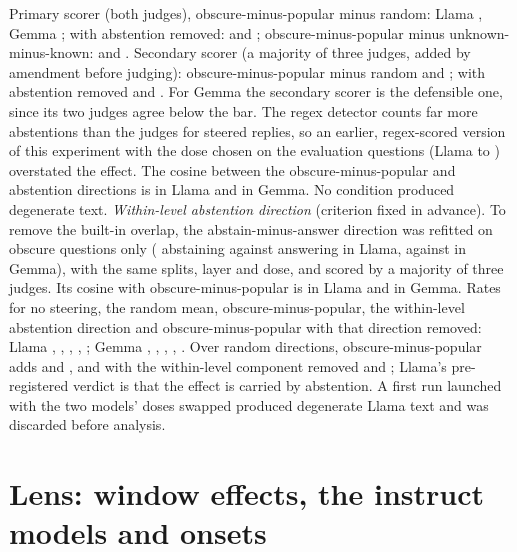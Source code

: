 \documentclass{article}
\begin{document}
Primary scorer (both judges), obscure-minus-popular minus random: Llama \svLlamaDOne{} \svLlamaDOneCI, Gemma \svGemmaDOne{} \svGemmaDOneCI; with abstention removed: \svLlamaDTwo{} \svLlamaDTwoCI{} and \svGemmaDTwo{} \svGemmaDTwoCI; obscure-minus-popular minus unknown-minus-known: \svLlamaDThree{} \svLlamaDThreeCI{} and \svGemmaDThree{} \svGemmaDThreeCI. Secondary scorer (a majority of three judges, added by amendment before judging): obscure-minus-popular minus random \svLlamaMajDOne{} \svLlamaMajDOneCI{} and \svGemmaMajDOne{} \svGemmaMajDOneCI; with abstention removed \svLlamaMajDTwo{} \svLlamaMajDTwoCI{} and \svGemmaMajDTwo{} \svGemmaMajDTwoCI. For Gemma the secondary scorer is the defensible one, since its two judges agree below the bar. The regex detector counts far more abstentions than the judges for steered replies, so an earlier, regex-scored version of this experiment with the dose chosen on the evaluation questions (Llama \stLlamaNone{} to \stLlamaFam) overstated the effect. The cosine between the obscure-minus-popular and abstention directions is \svLlamaCos{} in Llama and \svGemmaCos{} in Gemma. No condition produced degenerate text.
\emph{Within-level abstention direction} (criterion fixed in advance). To remove the built-in overlap, the abstain-minus-answer direction was refitted on obscure questions only (\wlLlamaHi{} abstaining against \wlLlamaLo{} answering in Llama, \wlGemmaHi{} against \wlGemmaLo{} in Gemma), with the same splits, layer and dose, and scored by a majority of three judges. Its cosine with obscure-minus-popular is \wlLlamaCos{} in Llama and \wlGemmaCos{} in Gemma. Rates for no steering, the random mean, obscure-minus-popular, the within-level abstention direction and obscure-minus-popular with that direction removed: Llama \wlLlamaNone, \wlLlamaRand, \wlLlamaFam, \wlLlamaAbst, \wlLlamaPerp; Gemma \wlGemmaNone, \wlGemmaRand, \wlGemmaFam, \wlGemmaAbst, \wlGemmaPerp. Over random directions, obscure-minus-popular adds \wlLlamaDOne{} \wlLlamaDOneCI{} and \wlGemmaDOne{} \wlGemmaDOneCI, and with the within-level component removed \wlLlamaDTwo{} \wlLlamaDTwoCI{} and \wlGemmaDTwo{} \wlGemmaDTwoCI; Llama's pre-registered verdict is that the effect is carried by abstention. A first run launched with the two models' doses swapped produced degenerate Llama text and was discarded before analysis.

\section{Lens: window effects, the instruct models and onsets}
\label{app:lens}
\end{document}
